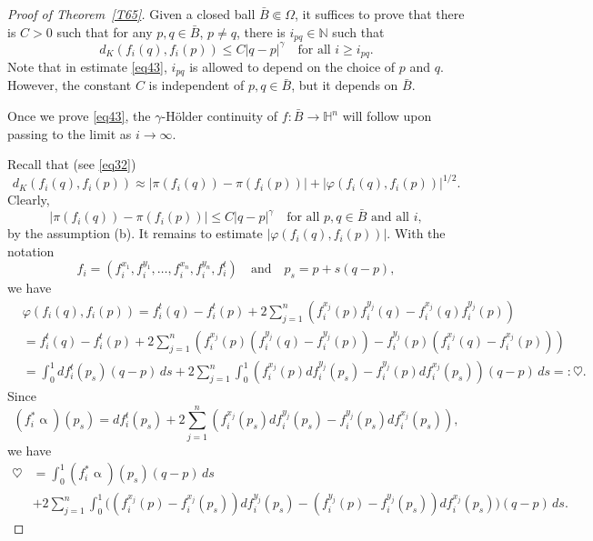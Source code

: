 \documentclass[intlimits,12pt,reqno]{amsart}
\newcommand{\bbbn}{\mathbb N}
\newcommand{\bbbh}{\mathbb H}
\numberwithin{equation}{section}
\theoremstyle{definition}
\begin{document}
\begin{proof}[Proof of Theorem~\ref{T65}]
Given a closed ball $\bar{B}\Subset\Omega$, it suffices to prove that there is $C>0$ 
such that for any $p,q\in\bar{B}$, $p\neq q$, there is 
$i_{pq}\in\bbbn$ such that
\begin{equation}
\label{eq43}
d_K(f_i(q),f_i(p))\leq C|q-p|^\gamma
\quad
\text{for all $i\geq i_{pq}$.}
\end{equation}
Note that in estimate \eqref{eq43}, $i_{pq}$ is allowed to depend on the choice of $p$ and $q$. However, the constant $C$ is independent of $p,q\in\bar{B}$, but it depends on $\bar{B}$.

Once we prove \eqref{eq43}, the $\gamma$-H\"older continuity of $f:\bar{B}\to \bbbh^n$ will follow upon passing to the limit as $i\to\infty$.

Recall that (see \eqref{eq32})
\begin{equation}
\label{eq45}
d_K(f_i(q),f_i(p))\approx |\pi(f_i(q))-\pi(f_i(p))|+
|\varphi(f_i(q),f_i(p))|^{1/2}.
\end{equation}
Clearly,
\begin{equation}
\label{eq46}
|\pi(f_i(q))-\pi(f_i(p))|\leq  C|q-p|^\gamma
\quad
\text{for all $p,q\in\bar{B}$ and all $i$},
\end{equation}
by the assumption (b).
It remains to estimate $|\varphi(f_i(q),f_i(p))|$. With the notation
$$
f_i=(f_i^{x_1},f_i^{y_1},\ldots,f_i^{x_n},f_i^{y_n},f_i^t)
\quad
\text{and}
\quad
p_s=p+s(q-p),
$$
we have
\begin{equation*}
\begin{split}
&\varphi(f_i(q),f_i(p)) 
=
f_i^t(q)-f_i^t(p)+2\sum_{j=1}^n\left(f_i^{x_j}(p)f_i^{y_j}(q)-f_i^{x_j}(q)f_i^{y_j}(p)\right)\\
&=
f_i^t(q)-f_i^t(p)+2\sum_{j=1}^n \left(f_i^{x_j}(p)(f_i^{y_j}(q)-f_i^{y_j}(p))-f_i^{y_j}(p)(f_i^{x_j}(q)-f_i^{x_j}(p))\right)\\
&=
\int_0^1 df_i^t(p_s)(q-p)\, ds+
2\sum_{j=1}^n \int_0^1 (f_i^{x_j}(p)df_i^{y_j}(p_s)-f_i^{y_j}(p)df_i^{x_j}(p_s))(q-p)\, ds=:\heartsuit.
\end{split}    
\end{equation*}
Since
$$
(f_i^*\upalpha)(p_s)=df_i^t(p_s)+2\sum_{j=1}^n (f_i^{x_j}(p_s)df_i^{y_j}(p_s)-f_i^{y_j}(p_s)df_i^{x_j}(p_s)),
$$
we have
\begin{equation*}
\begin{split}
\heartsuit
&=
\int_0^1 (f_i^*\upalpha)(p_s)(q-p)\, ds\\ 
&+
2\sum_{j=1}^n\int_0^1\big((f_i^{x_j}(p)-f_i^{x_j}(p_s))df_i^{y_j}(p_s)-(f^{y_j}_i(p)-f_i^{y_j}(p_s))df_i^{x_j}(p_s)\big)(q-p)\, ds.

\end{split}
\end{equation*}
\end{proof}
\end{document}
